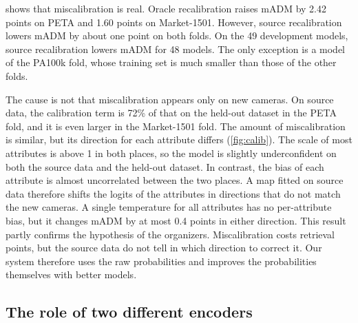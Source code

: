 \documentclass[10pt,twocolumn,letterpaper]{article}
\begin{document}
 shows that miscalibration is real. Oracle recalibration raises mADM by 2.42 points on PETA and 1.60 points on Market-1501. However, source recalibration lowers mADM by about one point on both folds. On the 49 development models, source recalibration lowers mADM for 48 models. The only exception is a model of the PA100k fold, whose training set is much smaller than those of the other folds.

The cause is not that miscalibration appears only on new cameras. On source data, the calibration term is 72\% of that on the held-out dataset in the PETA fold, and it is even larger in the Market-1501 fold. The amount of miscalibration is similar, but its direction for each attribute differs (\cref{fig:calib}). The scale of most attributes is above 1 in both places, so the model is slightly underconfident on both the source data and the held-out dataset. In contrast, the bias of each attribute is almost uncorrelated between the two places. A map fitted on source data therefore shifts the logits of the attributes in directions that do not match the new cameras. A single temperature for all attributes has no per-attribute bias, but it changes mADM by at most 0.4 points in either direction. This result partly confirms the hypothesis of the organizers. Miscalibration costs retrieval points, but the source data do not tell in which direction to correct it. Our system therefore uses the raw probabilities and improves the probabilities themselves with better models.

\subsection{The role of two different encoders}
\label{sec:enc}
\end{document}
